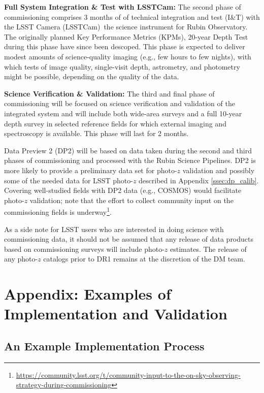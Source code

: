 \documentclass[DM,lsstdraft,toc]{lsstdoc}
\begin{document}
{\bf Full System Integration \& Test with LSSTCam:}
The second phase of commissioning comprises 3 months of of technical integration and test (I\&T) with  the LSST Camera (LSSTCam) \textemdash \,the science instrument for Rubin Observatory. 
The originally planned Key Performance Metrics (KPMs), 20-year Depth Test during this phase have since been descoped. 
This phase is expected to deliver modest amounts of science-quality imaging (e.g., few hours to few nights), with which tests of image quality, single-visit depth, astrometry, and photometry might be possible, depending on the quality of the data. 

{\bf Science Verification \& Validation:}
The third and final phase of commissioning will be focused on science verification and validation of the integrated system and will include both wide-area surveys and a full 10-year depth survey in selected reference fields for which external imaging and spectroscopy is available. 
This phase will last for 2 months. 

Data Preview 2 (DP2) will be based on data taken during the second and third phases of commissioning and processed with the Rubin Science Pipelines. 
DP2 is more likely to provide a preliminary data set for photo-$z$ validation and possibly some of the needed 
 data for LSST photo-$z$ described in Appendix \ref{ssec:dp_calib}. 
Covering well-studied fields with DP2 data (e.g., COSMOS) would facilitate photo-$z$ validation; note that the effort to collect community input on the commissioning fields is underway\footnote{\url{https://community.lsst.org/t/community-input-to-the-on-sky-observing-strategy-during-commissioning}}.

As a side note for LSST users who are interested in doing science with commissioning data, it should not be assumed that any release of data products based on commissioning surveys will include photo-$z$ estimates.
The release of any photo-$z$ catalogs prior to DR1 remains at the discretion of the DM team.



\clearpage
\appendix 

\section{Appendix: Examples of Implementation and Validation}\label{sec:imp}

\subsection{An Example Implementation Process}\label{ssec:imp_imp}
\end{document}
